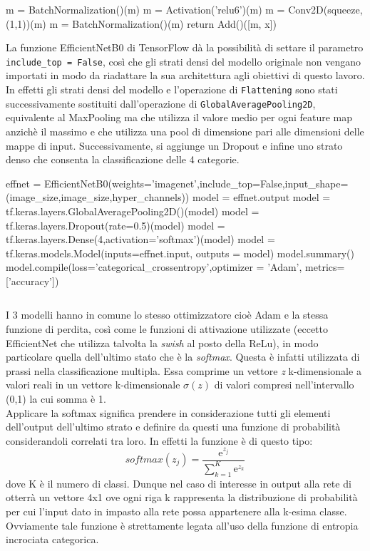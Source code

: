 \begin{enumerate}
\begin{python}
  m = BatchNormalization()(m)
  m = Activation('relu6')(m)
  m = Conv2D(squeeze, (1,1))(m)
  m = BatchNormalization()(m)
  return Add()([m, x])
  \end{python}
   La funzione EfficientNetB0 di TensorFlow dà la possibilità di settare il parametro \lstinline{include_top = False}, così che gli strati 
    densi del modello originale non vengano importati in modo da riadattare la sua architettura agli obiettivi di questo lavoro.\\
    In effetti gli strati densi del modello e l'operazione di \lstinline{Flattening} sono stati successivamente sostituiti
     dall'operazione di \lstinline{GlobalAveragePooling2D}, equivalente al MaxPooling
    ma che utilizza il valore medio per ogni feature map anzichè il massimo 
    e che utilizza una pool di dimensione pari alle dimensioni delle mappe di input. Successivamente, si aggiunge
     un Dropout e infine uno strato denso che consenta la classificazione delle 4 categorie.  
    
    \begin{python}
effnet = EfficientNetB0(weights='imagenet',include_top=False,input_shape=(image_size,image_size,hyper_channels))
model = effnet.output
model = tf.keras.layers.GlobalAveragePooling2D()(model)
model = tf.keras.layers.Dropout(rate=0.5)(model)
model = tf.keras.layers.Dense(4,activation='softmax')(model)
model = tf.keras.models.Model(inputs=effnet.input, outputs = model)
model.summary()   
model.compile(loss='categorical_crossentropy',optimizer = 'Adam', metrics= ['accuracy'])
\end{python}
\begin{lstlisting}[caption= {Codice realizzato per applicare il Trasfer Learning.} ]
\end{lstlisting}

    
    I 3 modelli hanno in comune lo stesso ottimizzatore cioè Adam e la stessa funzione di perdita, 
    così come le funzioni di attivazione 
    utilizzate (eccetto EfficientNet che utilizza talvolta la \emph{swish} al posto della ReLu), in modo
     particolare quella dell'ultimo 
    stato che è la \emph{softmax}. Questa è infatti utilizzata 
    di prassi nella classificazione multipla. Essa comprime un vettore \emph{z} k-dimensionale a
     valori reali in un vettore 
    k-dimensionale $\sigma(z)$ di valori compresi nell'intervallo (0,1) la cui somma è 1.\\
    Applicare la softmax significa prendere in considerazione tutti gli elementi dell'output dell'ultimo
     strato e definire da questi una funzione di probabilità considerandoli correlati tra loro.
     In effetti la funzione è di questo tipo: \[softmax(z_j) = \frac{\mathrm{e}^{z_j}}{\sum_{k=1}^{K}\mathrm{e}^{z_k}} \]
     dove K è il numero di classi. Dunque nel caso di interesse in output alla rete di otterrà un vettore 4x1 ove ogni riga k
      rappresenta la distribuzione di probabilità per cui l'input dato in impasto alla rete possa appartenere
       alla k-esima classe. Ovviamente tale funzione è strettamente legata all'uso della funzione
        di entropia incrociata categorica.
    
  \end{enumerate}


